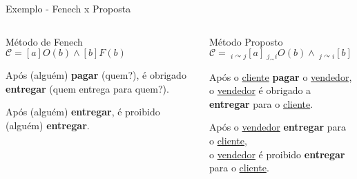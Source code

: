 \begin{frame}{Exemplo - Fenech x Proposta}
    \begin{columns}[onlytextwidth]
        \begin{column}{0.48\textwidth}
            \begin{block}{Método de Fenech}
                {\small$\mathcal{C} = [a]O(b) \wedge [b]F(b)$}
                
                \quad
                
                Após ({\color{red}alguém}) \textbf{pagar} ({\color{red}quem?}), é obrigado \textbf{entregar} ({\color{red}quem entrega para quem?}).
                
                \quad
                
                \quad
                
                Após ({\color{red}alguém}) \textbf{entregar}, é proibido ({\color{red}alguém}) \textbf{entregar}.
                
                \quad
                
                \quad
                
                \quad
                
            \end{block}
        \end{column}
        \begin{column}{0.48\textwidth}
            \begin{block}{Método Proposto}
                {\small $\mathcal{C} =\ _{i\curvearrowright j}[a]\ _{j_\curvearrowright i}O(b) \wedge \ _{j\curvearrowright i}[b]\ _{j\curvearrowright i}F(b)$}
                
                \quad
                
                Após o \underline{cliente} \textbf{pagar} o \underline{vendedor}, \\ o \underline{vendedor} é obrigado a \textbf{entregar} para o \underline{cliente}.
                
                \quad
                
                \quad
                
                Após o \underline{vendedor} \textbf{entregar} para o \underline{cliente}, \\ o \underline{vendedor} é proibido \textbf{entregar} para o \underline{cliente}.
                
                \quad
                
            \end{block}
        \end{column}
    \end{columns}
\end{frame}

